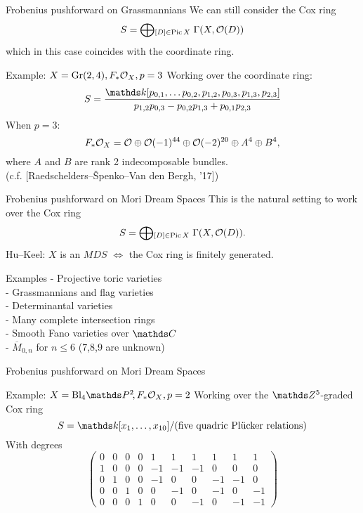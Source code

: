 \documentclass[beamer]{paper}
\def\OO{\mathcal{O}}
\begin{document}
\begin{frame}{Frobenius pushforward on Grassmannians}
  We can still consider the Cox ring
  \[ S = \bigoplus\!{}_{[D]\in\Pic{X}} \; \Gamma(X, \OO(D)) \]
  which in this case coincides with the coordinate ring.

  \begin{block}{Example: $X = \mathrm{Gr(2,4)}, F_*\mathcal{O}_X, p = 3$}
    Working over the coordinate ring:
    \[ S = \frac{\kk[p_{0,1},\dots p_{0,2},p_{1,2},p_{0,3},p_{1,3},p_{2,3}]}{p_{1,2}p_{0,3}-p_{0,2}p_{1,3}+p_{0,1}p_{2,3}} \]
    When $p = 3$:
    \[ F_*\mathcal{O}_X = \mathcal{O} \oplus \mathcal{O}(-1)^{44} \oplus \mathcal{O}(-2)^{20} \oplus A^4 \oplus B^4, \]
    where $A$ and $B$ are rank 2 indecomposable bundles. \\
    \hfill (c.f. [Raedschelders--Špenko--Van den Bergh, '17])
  \end{block}
\end{frame}


\begin{frame}{Frobenius pushforward on Mori Dream Spaces}
  This is the natural setting to work over the Cox ring
  \[ S = \bigoplus\!{}_{[D]\in\Pic{X}} \; \Gamma(X, \OO(D)). \]
  Hu--Keel: $X$ is an $MDS$ $\iff$ the Cox ring is finitely generated.

  \vfill
  \begin{exampleblock}{Examples}
  \; - Projective toric varieties \\
  \; - Grassmannians and flag varieties \\
  \; - Determinantal varieties \\
  \; - Many complete intersection rings \\
  \; - Smooth Fano varieties over $\CC$ \\
  \; - $\overline{M}_{0,n}$ for $n\leq 6$ (7,8,9 are unknown)
  \end{exampleblock}
\end{frame}

\begin{frame}{Frobenius pushforward on Mori Dream Spaces}
  \begin{block}{Example: $X = \mathrm{Bl}_4\PP2, F_*\o_X, p = 2$}
    Working over the $\ZZ^5$-graded Cox ring \vspace*{-0.15in}
    \[ S = \kk[x_1,\dots,x_{10}]/\text{(five quadric Pl\"ucker relations)} \]
    With degrees \vspace*{-0.15in}
    \[
    \left(\!\begin{array}{cccccccccc}
      0&0&0&0&1&1&1&1&1&1 \\
      1&0&0&0&-1&-1&-1&0&0&0 \\
      0&1&0&0&-1&0&0&-1&-1&0 \\
      0&0&1&0&0&-1&0&-1&0&-1 \\
      0&0&0&1&0&0&-1&0&-1&-1
    \end{array}\!\right)
    \]
  \end{block}
\end{frame}
\end{document}
